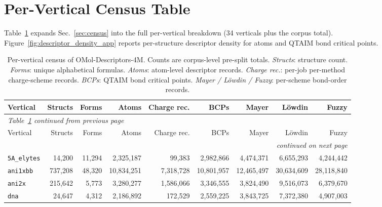 \section{Per-Vertical Census Table}
\label{app:t1_census}

Table~\ref{tab:t1_census} expands Sec.~\ref{sec:census} into the full
per-vertical breakdown (34 verticals plus the corpus total).
Figure~\ref{fig:descriptor_density_app} reports per-structure descriptor
density for atoms and QTAIM bond critical points.

\begin{scriptsize}
\setlength{\tabcolsep}{2.5pt}
\begin{longtable}{lrrrrrrrr}
\caption{Per-vertical census of OMol-Descriptors-4M. Counts are
corpus-level pre-split totals. \textit{Structs}: structure count.
\textit{Forms}: unique alphabetical formulas. \textit{Atoms}: atom-level
descriptor records. \textit{Charge rec.}: per-job per-method charge-scheme
records. \textit{BCPs}: QTAIM bond critical points.
\textit{Mayer / L\"owdin / Fuzzy}: per-scheme bond-order records.}
\label{tab:t1_census} \\
\toprule
Vertical & Structs & Forms & Atoms & Charge rec. & BCPs & Mayer & L\"owdin & Fuzzy \\
\midrule
\endfirsthead
\multicolumn{9}{l}{\small\textit{Table~\ref{tab:t1_census} continued from previous page}} \\
\toprule
Vertical & Structs & Forms & Atoms & Charge rec. & BCPs & Mayer & L\"owdin & Fuzzy \\
\midrule
\endhead
\midrule
\multicolumn{9}{r}{\small\textit{continued on next page}} \\
\endfoot
\bottomrule
\endlastfoot
\texttt{5A\_elytes}              &     14{,}200 &     11{,}294 &   2{,}325{,}187 &      99{,}383 &   2{,}982{,}866 &    4{,}474{,}371 &    6{,}655{,}293 &    4{,}244{,}442 \\
\texttt{ani1xbb}                 &    737{,}208 &     48{,}320 &  10{,}834{,}251 &   7{,}318{,}728 &  10{,}801{,}957 &   12{,}465{,}497 &   30{,}634{,}609 &   28{,}118{,}840 \\
\texttt{ani2x}                   &    215{,}642 &      5{,}773 &   3{,}280{,}277 &   1{,}586{,}066 &   3{,}346{,}555 &    3{,}824{,}490 &    9{,}516{,}073 &    6{,}379{,}670 \\
\texttt{dna}                     &     24{,}647 &      4{,}312 &   2{,}186{,}892 &     172{,}529 &   2{,}559{,}225 &    3{,}843{,}725 &    7{,}372{,}380 &    4{,}907{,}003 \\

\end{longtable}
\end{scriptsize}
